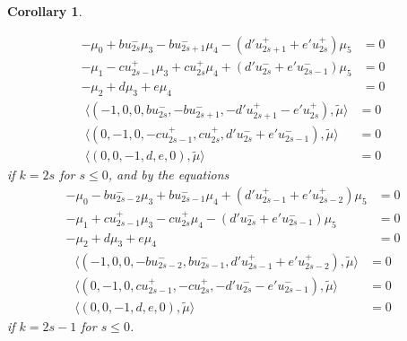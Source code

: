 \documentclass{amsart}
\newtheorem{corollary}[theorem]{Corollary}
\numberwithin{theorem}{section}
\begin{document}
\begin{corollary}
\begin{enumerate}
        \begin{align*}
          -\mu_0 + b u_{2s}^- \mu_3 - b u_{2s+1}^- \mu_4 - (d' u_{2s+1}^+ + e' u_{2s}^+) \mu_5 &= 0\\
          -\mu_1 - c u_{2s-1}^+ \mu_3 + c u_{2s}^+ \mu_4 + (d' u_{2s}^- + e' u_{2s-1}^-) \mu_5 &= 0\\
          -\mu_2 + d \mu_3 + e \mu_4 &= 0
        \end{align*}
        \begin{align*}
          \langle (-1,0,0, b u_{2s}^-, -b u_{2s+1}^-, -d' u_{2s+1}^+ - e' u_{2s}^+), \tilde\mu \rangle &= 0\\
          \langle (0,-1,0, -c u_{2s-1}^+, c u_{2s}^+, d' u_{2s}^- + e' u_{2s-1}^-), \tilde\mu \rangle &= 0\\
          \langle (0,0,-1, d, e, 0), \tilde\mu \rangle &= 0
        \end{align*}
        if $k=2s$ for $s \le 0$, and by the equations
        \begin{align*}
          -\mu_0 - b u_{2s-2}^- \mu_3 + b u_{2s-1}^- \mu_4 + (d' u_{2s-1}^+ + e' u_{2s-2}^+) \mu_5 &= 0\\
          -\mu_1 + c u_{2s-1}^+ \mu_3 - c u_{2s}^+ \mu_4 - (d' u_{2s}^- + e' u_{2s-1}^-) \mu_5 &= 0\\
          -\mu_2 + d \mu_3 + e \mu_4 &= 0
        \end{align*}
        \begin{align*}
          \langle (-1,0,0, -b u_{2s-2}^-, b u_{2s-1}^-, d' u_{2s-1}^+ + e' u_{2s-2}^+), \tilde\mu \rangle &= 0\\
          \langle (0,-1,0, c u_{2s-1}^+, -c u_{2s}^+, -d' u_{2s}^- - e' u_{2s-1}^-), \tilde\mu \rangle &= 0\\
          \langle (0,0,-1, d, e, 0), \tilde\mu \rangle &= 0
        \end{align*}
        if $k=2s-1$ for $s \le 0$.
    \end{enumerate}
  \end{corollary}
\end{document}
